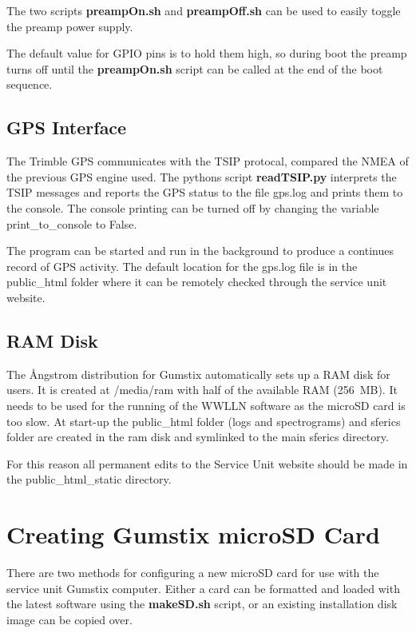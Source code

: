 The two scripts {\bf preampOn.sh} and {\bf preampOff.sh} can be used to easily toggle the preamp power supply.

The default value for GPIO pins is to hold them high, so during boot the preamp turns off until the {\bf preampOn.sh} script can be called at the end of the boot sequence.

\subsection{GPS Interface}

The Trimble GPS communicates with the TSIP protocal, compared the NMEA of the previous GPS engine used.
The pythons script {\bf readTSIP.py} interprets the TSIP messages and reports the GPS status to the file gps.log and prints them to the console.
The console printing can be turned off by changing the variable print\_to\_console to False.

The program can be started and run in the background to produce a continues record of GPS activity.
The default location for the gps.log file is in the public\_html folder where it can be remotely checked through the service unit website.

\subsection{RAM Disk}

The \r{A}ngstrom distribution for Gumstix automatically sets up a RAM disk for users.
It is created at /media/ram with half of the available RAM (256~MB).
It needs to be used for the running of the WWLLN software as the microSD card is too slow.
At start-up the public\_html folder (logs and spectrograms) and sferics folder are created in the ram disk and symlinked to the main sferics directory.

For this reason all permanent edits to the Service Unit website should be made in the public\_html\_static directory.

\section{Creating Gumstix microSD Card}

There are two methods for configuring a new microSD card for use with the service unit Gumstix computer.
Either a card can be formatted and loaded with the latest software using the {\bf makeSD.sh} script, or an existing installation disk image can be copied over.

